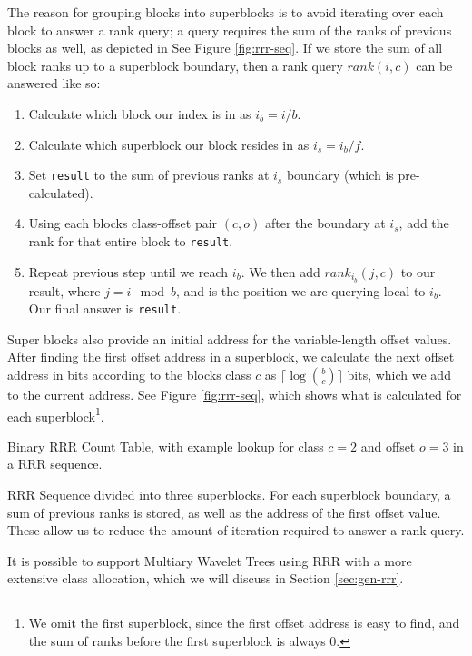 The reason for grouping blocks into superblocks is to avoid iterating over each
block to answer a rank query; a query requires the sum of the ranks of previous
blocks as well, as depicted in See Figure \ref{fig:rrr-seq}. If we store the sum 
of all block ranks up to a superblock boundary, then a rank query $rank(i, c)$ 
can be answered like so:

\begin{enumerate}
	\item
		Calculate which block our index is in as $i_b = i / b$.
	\item
		Calculate which superblock our block resides in as $i_s = i_b / f$.
	\item
		Set \texttt{result} to the sum of previous ranks at $i_s$ boundary (which is 
		pre-calculated).
	\item
		Using each blocks class-offset pair $(c, o)$ after the boundary at 
		$i_s$, add the rank for that entire block to \texttt{result}.
	\item
		Repeat previous step until we reach $i_b$. We then add $rank_{i_b}(j, 
		c)$ to our result, where $j = i \mod b$, and is the position we are 
		querying local to $i_b$. Our final answer is \texttt{result}.
\end{enumerate}

Super blocks also provide an initial address for the variable-length offset 
values. After finding the first offset address in a superblock, we calculate the 
next offset address in bits according to the blocks class $c$ as $\lceil\log 
{b \choose c}\rceil$ bits, which we add to the current address. See Figure 
\ref{fig:rrr-seq}, which shows what is calculated for each 
superblock\footnote{We omit the first superblock, since the first offset address 
is easy to find, and the sum of ranks before the first superblock is always 
$0$.}.

		{Binary RRR Count Table, with example lookup for class $c = 2$
		and offset $o = 3$ in a RRR sequence.}

		{RRR Sequence divided into three superblocks. For each superblock
		boundary, a sum of previous ranks is stored, as well as the address
		of the first offset value. These allow us to reduce the amount of 
		iteration required to answer a rank query.}

It is possible to support Multiary Wavelet Trees using RRR with a more extensive 
class allocation, which we will discuss in Section \ref{sec:gen-rrr}.

